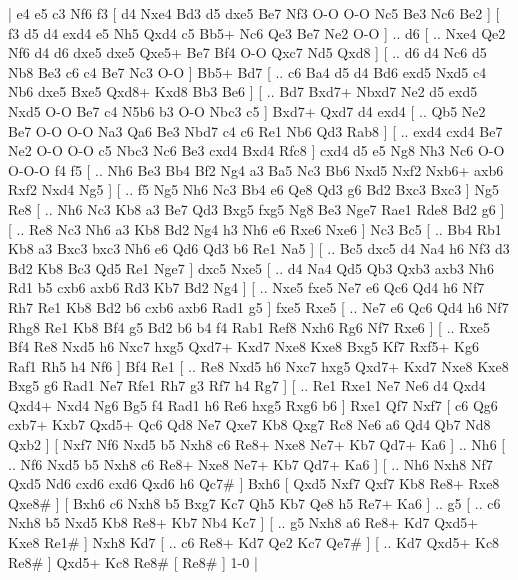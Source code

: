\makegametitle 
|   e4   e5    c3   Nf6    f3 [  d4 Nxe4  Bd3 d5  dxe5 Be7  Nf3 O-O  O-O Nc5  Be3 Nc6  Be2   ]  [  f3 d5  d4 exd4  e5 Nh5  Qxd4 c5  Bb5+ Nc6  Qe3 Be7  Ne2 O-O   ] .. d6 [ .. Nxe4  Qe2 Nf6  d4 d6  dxe5 dxe5  Qxe5+ Be7  Bf4 O-O  Qxc7 Nd5  Qxd8   ]  [ .. d6  d4 Nc6  d5 Nb8  Be3 c6  c4 Be7  Nc3 O-O   ]  Bb5+   Bd7 [ .. c6  Ba4 d5  d4 Bd6  exd5 Nxd5  c4 Nb6  dxe5 Bxe5  Qxd8+ Kxd8  Bb3 Be6   ]  [ .. Bd7  Bxd7+ Nbxd7  Ne2 d5  exd5 Nxd5  O-O Be7  c4 N5b6  b3 O-O  Nbc3 c5   ]  Bxd7+   Qxd7    d4   exd4 [ .. Qb5  Ne2 Be7  O-O O-O  Na3 Qa6  Be3 Nbd7  c4 c6  Re1 Nb6  Qd3 Rab8   ]  [ .. exd4  cxd4 Be7  Ne2 O-O  O-O c5  Nbc3 Nc6  Be3 cxd4  Bxd4 Rfc8   ]  cxd4   d5    e5   Ng8    Nh3   Nc6    O-O   O-O-O    f4   f5 [ .. Nh6  Be3 Bb4  Bf2 Ng4  a3 Ba5  Nc3 Bb6  Nxd5 Nxf2  Nxb6+ axb6  Rxf2 Nxd4  Ng5   ]  [ .. f5  Ng5 Nh6  Nc3 Bb4  e6 Qe8  Qd3 g6  Bd2 Bxc3  Bxc3   ]  Ng5   Re8 [ .. Nh6  Nc3 Kb8  a3 Be7  Qd3 Bxg5  fxg5 Ng8  Be3 Nge7  Rae1 Rde8  Bd2 g6   ]  [ .. Re8  Nc3 Nh6  a3 Kb8  Bd2 Ng4  h3 Nh6  e6 Rxe6  Nxe6   ]  Nc3   Bc5 [ .. Bb4  Rb1 Kb8  a3 Bxc3  bxc3 Nh6  e6 Qd6  Qd3 b6  Re1 Na5   ]  [ .. Bc5  dxc5 d4  Na4 h6  Nf3 d3  Bd2 Kb8  Bc3 Qd5  Re1 Nge7   ]  dxc5   Nxe5 [ .. d4  Na4 Qd5  Qb3 Qxb3  axb3 Nh6  Rd1 b5  cxb6 axb6  Rd3 Kb7  Bd2 Ng4   ]  [ .. Nxe5  fxe5 Ne7  e6 Qc6  Qd4 h6  Nf7 Rh7  Re1 Kb8  Bd2 b6  cxb6 axb6  Rad1 g5   ]  fxe5   Rxe5 [ .. Ne7  e6 Qc6  Qd4 h6  Nf7 Rhg8  Re1 Kb8  Bf4 g5  Bd2 b6  b4 f4  Rab1 Ref8  Nxh6 Rg6  Nf7 Rxe6   ]  [ .. Rxe5  Bf4 Re8  Nxd5 h6  Nxc7 hxg5  Qxd7+ Kxd7  Nxe8 Kxe8  Bxg5 Kf7  Rxf5+ Kg6  Raf1 Rh5  h4 Nf6   ]  Bf4   Re1 [ .. Re8  Nxd5 h6  Nxc7 hxg5  Qxd7+ Kxd7  Nxe8 Kxe8  Bxg5 g6  Rad1 Ne7  Rfe1 Rh7  g3 Rf7  h4 Rg7   ]  [ .. Re1  Rxe1 Ne7  Ne6 d4  Qxd4 Qxd4+  Nxd4 Ng6  Bg5 f4  Rad1 h6  Re6 hxg5  Rxg6 b6   ]  Rxe1   Qf7    Nxf7 [  c6 Qg6  cxb7+ Kxb7  Qxd5+ Qc6  Qd8 Ne7  Qxe7 Kb8  Qxg7 Rc8  Ne6 a6  Qd4 Qb7  Nd8 Qxb2   ]  [  Nxf7 Nf6  Nxd5 b5  Nxh8 c6  Re8+ Nxe8  Ne7+ Kb7  Qd7+ Ka6   ] .. Nh6    [ .. Nf6  Nxd5 b5  Nxh8 c6  Re8+ Nxe8  Ne7+ Kb7  Qd7+ Ka6   ]  [ .. Nh6  Nxh8 Nf7  Qxd5 Nd6  cxd6 cxd6  Qxd6 h6  Qc7#   ]  Bxh6 [  Qxd5 Nxf7  Qxf7 Kb8  Re8+ Rxe8  Qxe8#   ]  [  Bxh6 c6  Nxh8 b5  Bxg7 Kc7  Qh5 Kb7  Qe8 h5  Re7+ Ka6   ] .. g5    [ .. c6  Nxh8 b5  Nxd5 Kb8  Re8+ Kb7  Nb4 Kc7   ]  [ .. g5  Nxh8 a6  Re8+ Kd7  Qxd5+ Kxe8  Re1#   ]  Nxh8   Kd7    [ .. c6  Re8+ Kd7  Qe2 Kc7  Qe7#   ]  [ .. Kd7  Qxd5+ Kc8  Re8#   ]  Qxd5+   Kc8   Re8#    [  Re8#   ] 1-0  |
